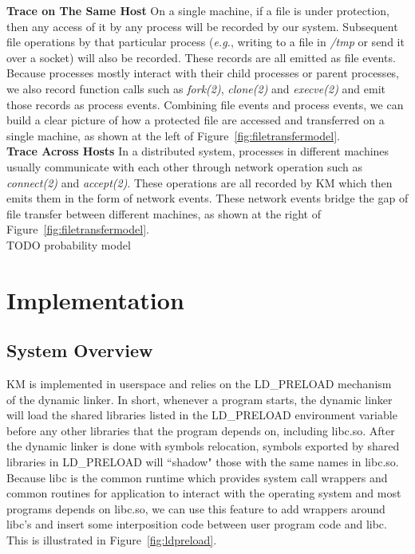 \documentclass[letterpaper,twocolumn,10pt]{article}
\begin{document}
\noindent
\textbf{Trace on The Same Host} On a single machine, if a file is under
protection, then any access of it by any process will be recorded by our
system. Subsequent file operations by that particular process (\textit{e.g.},
writing to a file in \textit{/tmp} or send it over a socket) will also be
recorded. These records are all emitted as file events. Because processes
mostly interact with their child processes or parent processes, we also
record function calls such as \textit{fork(2)}, \textit{clone(2)} and
\textit{execve(2)} and emit those records as process events. Combining file
events and process events, we can build a clear picture of how a protected
file are accessed and transferred on a single machine, as shown at the left
of Figure~\ref{fig:filetransfermodel}.\\ 

\noindent
\textbf{Trace Across Hosts} In a distributed system, processes in different
machines usually communicate with each other through network operation such
as \textit{connect(2)} and \textit{accept(2)}. These operations are all
recorded by KM which then emits them in the form of network events. These
network events bridge the gap of file transfer between different machines, as
shown at the right of Figure~\ref{fig:filetransfermodel}.\\

TODO probability model

\section{Implementation}

\subsection{System Overview}
KM is implemented in userspace and relies on the LD\_PRELOAD
mechanism~\cite{LD-PRELOAD-CITE} of the dynamic linker. In short, whenever a
program starts, the dynamic linker will load the shared libraries listed in
the LD\_PRELOAD environment variable before any other libraries that the
program depends on, including libc.so. After the dynamic linker is done with
symbols relocation, symbols exported by shared libraries in LD\_PRELOAD will
``shadow" those with the same names in libc.so. Because libc is the common
runtime which provides system call wrappers and common routines for application to interact with
the operating system and most programs depends on libc.so, we can use this
feature to add wrappers around libc's and insert some interposition code between
user program code and libc. This is illustrated in Figure~\ref{fig:ldpreload}.
\end{document}

